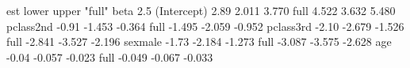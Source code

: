 \begin{Schunk}
\begin{Soutput}
              est  lower  upper "full"   beta  2.5 % 97.5 %
(Intercept)  2.89  2.011  3.770   full  4.522  3.632  5.480
pclass2nd   -0.91 -1.453 -0.364   full -1.495 -2.059 -0.952
pclass3rd   -2.10 -2.679 -1.526   full -2.841 -3.527 -2.196
sexmale     -1.73 -2.184 -1.273   full -3.087 -3.575 -2.628
age         -0.04 -0.057 -0.023   full -0.049 -0.067 -0.033
\end{Soutput}
\end{Schunk}
